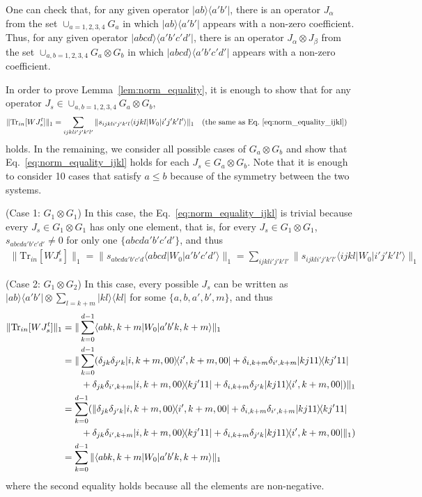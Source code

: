 \documentclass[a4paper,twocolumn,accepted=2022-10-23]{quantumarticle}
\newcommand{\bra}[1]{\langle {#1} \vert}
\newcommand{\ket}[1]{\vert {#1} \rangle}
\newcommand{\ketbra}[2]{\vert {#1} \rangle\!\langle {#2} \vert}
\newcommand{\Tr}[0]{{\mathrm{Tr}}}
\theoremstyle{definition}
\begin{document}
One can check that, for any given operator $\ketbra{ab}{a'b'}$, there is an operator $J_\alpha$ from the set $\cup_{a=1,2,3,4} G_a $ in which $\ketbra{ab}{a'b'}$ appears with a non-zero coefficient.
Thus, for any given operator $\ketbra{abcd}{a'b'c'd'}$, there is an operator $J_\alpha \otimes J_\beta$ from the set $\cup_{a,b=1,2,3,4} G_a \otimes G_b $ in which $\ketbra{abcd}{a'b'c'd'}$ appears with a non-zero coefficient.

In order to prove Lemma~\ref{lem:norm_equality}, it is enough to show that for any operator $J_s \in \cup_{a,b=1,2,3,4} G_a \otimes G_b$,
\begin{align}
\| \Tr_{in} [W J_s^t] \|_1 &= \sum_{ijkli'j'k'l'}  \| s_{ijkli'j'k'l} \bra{ijkl} W_0 \ket{i'j'k'l'} \|_1  \quad (\mbox{the same as Eq.}~\eqref{eq:norm_equality_ijkl}) \notag
\end{align}
holds.
In the remaining, we consider all possible cases of $G_a \otimes G_b$ and show that Eq.~\eqref{eq:norm_equality_ijkl} holds for each $J_s \in G_a \otimes G_b$.
Note that it is enough to consider 10 cases that satisfy $a \leq b$ because of the symmetry between the two systems.

(Case 1: $G_1 \otimes G_1$) \quad
In this case, the Eq.~\eqref{eq:norm_equality_ijkl} is trivial because every $J_s \in G_1 \otimes G_1$ has only one element,
that is, for every $J_s \in G_1 \otimes G_1$, $s_{abcda'b'c'd'} \neq 0$ for only one $\{ abcda'b'c'd' \}$,
and thus
\begin{align}
\| \Tr_{in} [W J_{s}^t] \|_1 = \| s_{abcda'b'c'd} \bra{abcd} W_0 \ket{a'b'c'd'} \|_1 = \sum_{ijkli'j'k'l'} \| s_{ijkli'j'k'l'}  \bra{ijkl} W_0 \ket{i'j'k'l'} \|_1
\end{align}



(Case 2: $G_1 \otimes G_2$) \quad
In this case, every possible $J_s$ can be written as $\ketbra{ab}{a'b'} \otimes \sum_{l=k+m} \ketbra{kl}{kl}$ for some $\{ a, b, a', b', m\}$,
and thus
\begin{align}
\| \Tr_{in} [W J_{s}^t] \|_1
&= \| \sum_{k=0}^{d-1} \bra{abk,k+m} W_0 \ket{a'b'k,k+m} \|_1 \\
&= \| \sum_{k=0}^{d-1} (\delta_{jk}\delta_{j'k} \ketbra{i,k+m,00}{i',k+m,00} + \delta_{i,k+m}\delta_{i',k+m} \ketbra{kj11}{kj'11} \notag \\
&\qquad + \delta_{jk}\delta_{i',k+m} \ketbra{i,k+m,00}{kj'11} + \delta_{i,k+m}\delta_{j'k} \ketbra{kj11}{i',k+m,00}) \|_1 \\
&= \sum_{k=0}^{d-1} (\| \delta_{jk}\delta_{j'k} \ketbra{i,k+m,00}{i',k+m,00} + \delta_{i,k+m}\delta_{i',k+m} \ketbra{kj11}{kj'11}\notag \\
&\qquad + \delta_{jk}\delta_{i',k+m} \ketbra{i,k+m,00}{kj'11} + \delta_{i,k+m}\delta_{j'k} \ketbra{kj11}{i',k+m,00} \|_1 ) \\
&= \sum_{k=0}^{d-1} \|  \bra{abk,k+m} W_0 \ket{a'b'k,k+m} \|_1
\end{align}
where the second equality holds because all the elements are non-negative.
\end{document}
